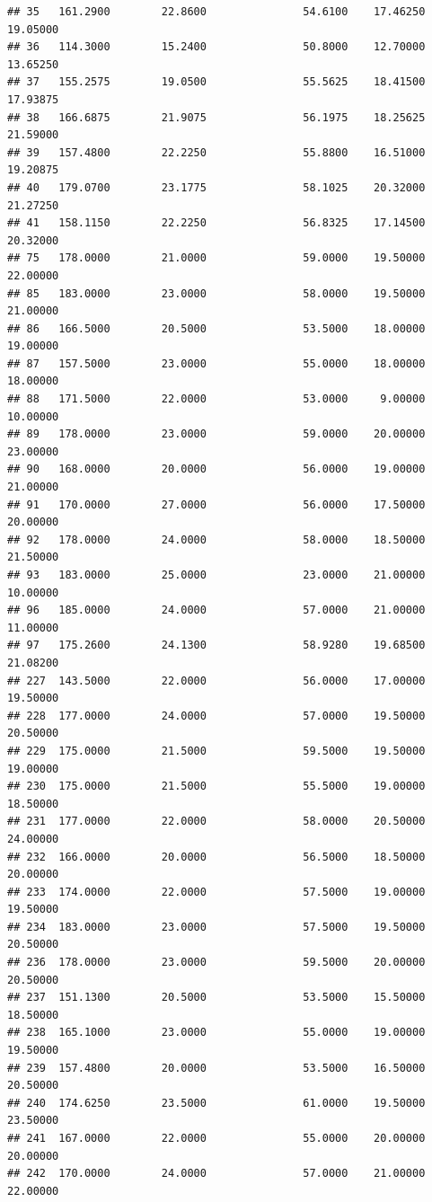 \documentclass[]{article}
\begin{document}
\begin{verbatim}
## 35   161.2900        22.8600               54.6100    17.46250   19.05000
## 36   114.3000        15.2400               50.8000    12.70000   13.65250
## 37   155.2575        19.0500               55.5625    18.41500   17.93875
## 38   166.6875        21.9075               56.1975    18.25625   21.59000
## 39   157.4800        22.2250               55.8800    16.51000   19.20875
## 40   179.0700        23.1775               58.1025    20.32000   21.27250
## 41   158.1150        22.2250               56.8325    17.14500   20.32000
## 75   178.0000        21.0000               59.0000    19.50000   22.00000
## 85   183.0000        23.0000               58.0000    19.50000   21.00000
## 86   166.5000        20.5000               53.5000    18.00000   19.00000
## 87   157.5000        23.0000               55.0000    18.00000   18.00000
## 88   171.5000        22.0000               53.0000     9.00000   10.00000
## 89   178.0000        23.0000               59.0000    20.00000   23.00000
## 90   168.0000        20.0000               56.0000    19.00000   21.00000
## 91   170.0000        27.0000               56.0000    17.50000   20.00000
## 92   178.0000        24.0000               58.0000    18.50000   21.50000
## 93   183.0000        25.0000               23.0000    21.00000   10.00000
## 96   185.0000        24.0000               57.0000    21.00000   11.00000
## 97   175.2600        24.1300               58.9280    19.68500   21.08200
## 227  143.5000        22.0000               56.0000    17.00000   19.50000
## 228  177.0000        24.0000               57.0000    19.50000   20.50000
## 229  175.0000        21.5000               59.5000    19.50000   19.00000
## 230  175.0000        21.5000               55.5000    19.00000   18.50000
## 231  177.0000        22.0000               58.0000    20.50000   24.00000
## 232  166.0000        20.0000               56.5000    18.50000   20.00000
## 233  174.0000        22.0000               57.5000    19.00000   19.50000
## 234  183.0000        23.0000               57.5000    19.50000   20.50000
## 236  178.0000        23.0000               59.5000    20.00000   20.50000
## 237  151.1300        20.5000               53.5000    15.50000   18.50000
## 238  165.1000        23.0000               55.0000    19.00000   19.50000
## 239  157.4800        20.0000               53.5000    16.50000   20.50000
## 240  174.6250        23.5000               61.0000    19.50000   23.50000
## 241  167.0000        22.0000               55.0000    20.00000   20.00000
## 242  170.0000        24.0000               57.0000    21.00000   22.00000

\end{verbatim}
\end{document}
